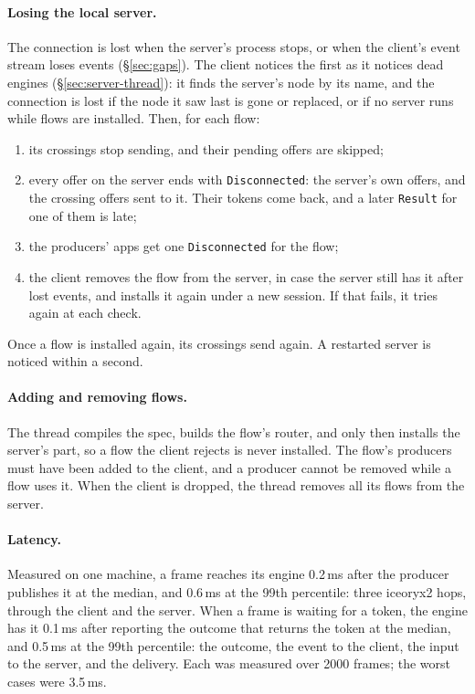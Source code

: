 \documentclass[11pt]{article}
\newcommand{\code}[1]{\texttt{#1}}
\begin{document}
\paragraph{Losing the local server.} The connection is lost when the
server's process stops, or when the client's event stream loses events
(\S\ref{sec:gaps}). The client notices the first as it notices dead engines
(\S\ref{sec:server-thread}): it finds the server's node by its name, and the
connection is lost if the node it saw last is gone or replaced, or if no
server runs while flows are installed. Then, for each flow:
\begin{enumerate}[nosep]
  \item its crossings stop sending, and their pending offers are skipped;
  \item every offer on the server ends with \code{Disconnected}: the
        server's own offers, and the crossing offers sent to it. Their
        tokens come back, and a later \code{Result} for one of them is late;
  \item the producers' apps get one \code{Disconnected} for the flow;
  \item the client removes the flow from the server, in case the server
        still has it after lost events, and installs it again under a new
        session. If that fails, it tries again at each check.
\end{enumerate}
Once a flow is installed again, its crossings send again. A restarted server
is noticed within a second.

\paragraph{Adding and removing flows.} The thread compiles the spec, builds
the flow's router, and only then installs the server's part, so a flow the
client rejects is never installed. The flow's producers must have been added
to the client, and a producer cannot be removed while a flow uses it. When
the client is dropped, the thread removes all its flows from the server.

\paragraph{Latency.} Measured on one machine, a frame reaches its engine
0.2\,ms after the producer publishes it at the median, and 0.6\,ms at the 99th
percentile: three iceoryx2 hops, through the client and the server. When a
frame is waiting for a token, the engine has it 0.1\,ms after reporting the
outcome that returns the token at the median, and 0.5\,ms at the 99th
percentile: the outcome, the event to the client, the input to the server,
and the delivery. Each was measured over 2000 frames; the worst cases were
3.5\,ms.
\end{document}
